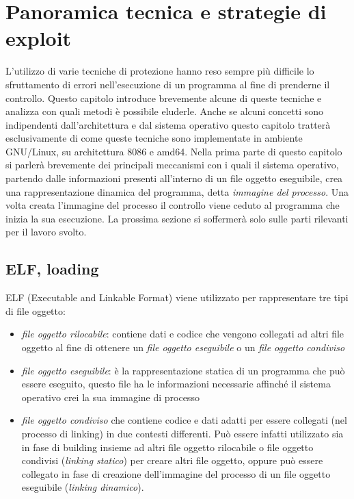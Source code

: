 \chapter{Panoramica tecnica e strategie di exploit}

L'utilizzo di varie tecniche di protezione hanno reso sempre più
difficile lo sfruttamento di errori nell'esecuzione di un programma al
fine di prenderne il controllo. Questo capitolo introduce brevemente
alcune di queste tecniche e analizza con quali metodi è possibile
eluderle. Anche se alcuni concetti sono indipendenti dall'architettura
e dal sistema operativo questo capitolo tratterà esclusivamente di come
queste tecniche sono implementate in ambiente GNU/Linux, su
architettura 8086 e amd64. Nella prima parte di questo capitolo si
parlerà brevemente dei principali meccanismi con i quali il sistema
operativo, partendo dalle informazioni presenti all'interno di un file
oggetto eseguibile, crea una rappresentazione dinamica del programma,
detta \emph{immagine del processo}. Una volta creata l'immagine del
processo il controllo viene ceduto al programma che inizia la sua
esecuzione. La prossima sezione si soffermerà solo sulle parti
rilevanti per il lavoro svolto.

\section{ELF, loading}

ELF (Executable and Linkable Format) viene utilizzato per 
rappresentare tre tipi di file oggetto:

\begin{itemize}
  \item \emph{file oggetto rilocabile}: contiene dati e codice che
    vengono collegati ad altri file oggetto al fine di ottenere un
    \emph{file oggetto eseguibile} o un \emph{file oggetto condiviso}

  \item \emph{file oggetto eseguibile}: è la rappresentazione statica
    di un programma che può essere eseguito, questo file ha le
    informazioni necessarie affinché il sistema operativo crei la sua
    immagine di processo

  \item \emph{file oggetto condiviso} che contiene codice e dati
    adatti per essere collegati (nel processo di linking) in due
    contesti differenti. Può essere infatti utilizzato sia in fase di
    building insieme ad altri file oggetto rilocabile o file oggetto
    condivisi (\emph{linking statico}) per creare altri file oggetto,
    oppure può essere collegato in fase di creazione dell'immagine del
    processo di un file oggetto eseguibile (\emph{linking dinamico}).

\end{itemize}

